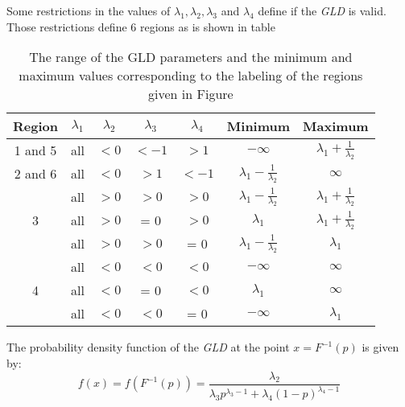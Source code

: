 Some restrictions in the values of $\lambda_{1}, \lambda_{2}, \lambda_{3}$ and  $\lambda_{4}$ define if the \textit{GLD} is valid. Those restrictions define 6 regions as is shown in table 

\begin{table}[]
\centering
\caption{The range of the GLD parameters and the minimum and maximum
values corresponding to the labeling of the regions given in Figure }
\label{my-label}
\begin{tabular}{|c|c|c|c|c|c|c|}
\hline
Region             & $\lambda_{1}$ & $\lambda_{2}$ & $\lambda_{3}$ & $\lambda_{4}$ & Minimum & Maximum \\ \hline
1 and 5            & all            & $< 0$    & $< -1$   & $> 1$ & $-\infty$                             & $\lambda_{1}+\frac{1}{\lambda_{2}}$ \\ \hline
2 and 6            & all            & $< 0$    & $> 1$ & $< -1$   & $\lambda_{1}-\frac{1}{\lambda_{2}}$ & $\infty$                                 \\ \hline
\multirow{3}{*}{3} & all            & $> 0$& $> 0$& $> 0$& $\lambda_{1}-\frac{1}{\lambda_{2}}$ & $\lambda_{1}+\frac{1}{\lambda_{2}}$ \\ \cline{2-7} 
                   & all            & $> 0$& = 0            & $> 0$& $\lambda_{1}$                       & $\lambda_{1}+\frac{1}{\lambda_{2}}$ \\ \cline{2-7} 
                   & all            & $> 0$& $> 0$& = 0            & $\lambda_{1}-\frac{1}{\lambda_{2}}$ & $\lambda_{1}$                       \\ \hline
\multirow{3}{*}{4} & all            & $< 0$    & $< 0$    & $< 0$    & $-\infty$                               & $\infty$                                 \\ \cline{2-7} 
                   & all            & $< 0$    & = 0            & $< 0$    & $\lambda_{1}$                       & $\infty$                                 \\ \cline{2-7} 
                   & all            & $< 0$    & $< 0$    & = 0            & $-\infty$                               & $\lambda_{1}$  
\end{tabular}
\end{table}

The probability density function of the \textit{GLD} at the point $x=F^{-1}(p)$ is given by:
\begin{equation}
f(x)=f(F^{-1}(p))=\frac{\lambda_{2}}{\lambda_{3}p^{\lambda_{3}-1}+\lambda_{4}(1-p)^{\lambda_{4}-1}}
\end{equation}

